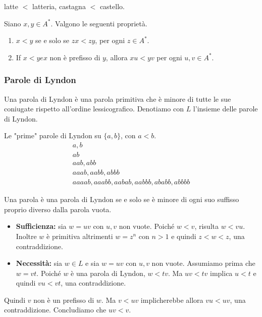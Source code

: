 \vspace{5mm}

\begin{center}
    latte $<$ latteria, castagna $<$ castello.
\end{center}

\vspace{5mm}

Siano $x, y \in A^{*}$. Valgono le seguenti proprietà.
\begin{enumerate}
    \item $x<y$ se e solo se $z x<z y$, per ogni $z \in A^{*}$.
    \item If $x<y e x$ non è prefisso di $y$, allora $x u<y v$ per ogni $u, v \in A^{*} .$
\end{enumerate}

\subsubsection{Parole di Lyndon}

Una parola di Lyndon è una parola primitiva che è minore di tutte le sue coniugate rispetto all'ordine lessicografico. Denotiamo con $L$ l'insieme delle parole di Lyndon.

Le "prime" parole di Lyndon su $\{a, b\}$, con $a<b$.
$$
\begin{gathered}
a, b \\
a b \\
a a b, a b b \\
a a a b, a a b b, a b b b \\
aaaab, aa a b b, a abab, a abbb, ababb, abbbb 
\end{gathered}
$$

Una parola è una parola di Lyndon se e solo se è minore di ogni suo suffisso proprio diverso dalla parola vuota.
\begin{itemize}
    \item \textbf{Sufficienza:} sia $w=u v$ con $u, v$ non vuote. Poiché $w<v$, risulta $w<v u$. Inoltre $w$ è primitiva altrimenti $w=z^{n}$ con $n>1$ e quindi $z<w<z$, una contraddizione.
    \item \textbf{Necessità:} sia $w \in L$ e sia $w=u v$ con $u, v$ non vuote. Assumiamo prima che $w=v t$. Poiché $w$ è una parola di Lyndon, $w<t v$. Ma $u v<t v$ implica $u<t$ e quindi $v u<v t$, una contraddizione.
\end{itemize}
Quindi $v$ non è un prefisso di $w .$ Ma $v<u v$ implicherebbe allora $v u<u v$, una contraddizione. Concludiamo che $u v<v .$

